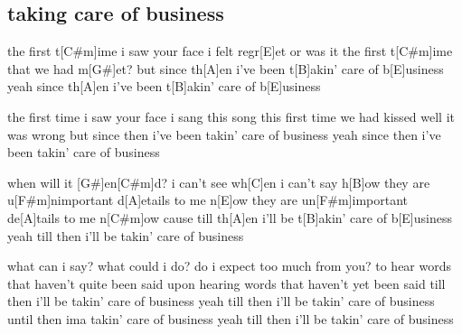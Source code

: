\subsection*{taking care of business   }
\begin{guitar}

the first t[C#m]ime i saw your face i felt regr[E]et
or was it the first t[C#m]ime that we had m[G#]et?
but since th[A]en i've been t[B]akin' care of b[E]usiness
yeah since th[A]en i've been t[B]akin' care of b[E]usiness



the first time i saw your face i sang this song
this first time we had kissed well it was wrong
but since then i've been takin' care of business
yeah since then i've been takin' care of business



when will it [G#]en[C#m]d?
i can't see wh[C]en
i can't say h[B]ow
they are u[F#m]nimportant d[A]etails to me n[E]ow
they are un[F#m]important de[A]tails to me n[C#m]ow
cause till th[A]en i'll be t[B]akin' care of b[E]usiness
yeah till then i'll be takin' care of business



what can i say?
what could i do?
do i expect
too much from you?
to hear words that haven't quite been said
upon hearing words that haven't yet been said
till then i'll be takin' care of business
yeah till then i'll be takin' care of business
until then ima takin' care of business
yeah till then i'll be takin' care of business
\end{guitar}
